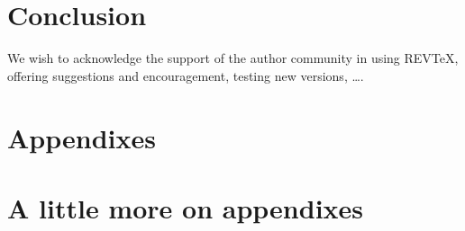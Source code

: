 \documentclass[%
 reprint,
 amsmath,amssymb,
 aps,
]{revtex4-2}
\begin{document}
\section{\label{sec:level1} Conclusion}








\begin{acknowledgments}
We wish to acknowledge the support of the author community in using
REV\TeX{}, offering suggestions and encouragement, testing new versions,
\dots.
\end{acknowledgments}

\appendix

\section{Appendixes}



\section{A little more on appendixes}



\nocite{*}



 \label{paper1}%

\end{document}
